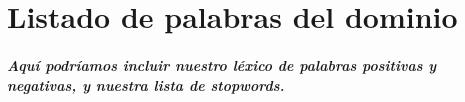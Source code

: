 \appendix
\chapter{Listado de palabras del dominio}\label{Anexos}

\paragraph{Aqu\'i podr\'iamos incluir nuestro l\'exico de palabras positivas y negativas, y nuestra lista de stopwords.}